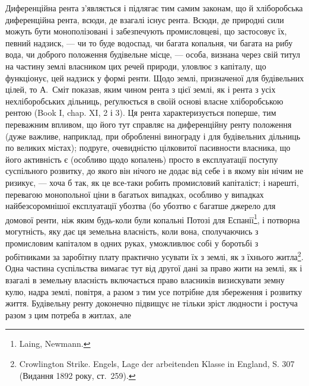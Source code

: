 Диференційна рента з’являється і підлягає тим самим законам, що й хліборобська
диференційна рента, всюди, де взагалі існує рента. Всюди, де природні
сили можуть бути монополізовані і забезпечують промисловцеві, що застосовує
їх, певний надзиск, — чи то буде водоспад, чи багата копальня, чи багата на
рибу вода, чи доброго положення будівельне місце, — особа, визнана через
свій титул на частину землі власником цих речей природи, уловлює з капіталу,
що функціонує, цей надзиск у формі ренти. Щодо землі, призначеної для будівельних
цілей, то А.~Сміт показав, яким чином рента з цієї землі, як і рента
з усіх нехліборобських дільниць, реґулюється в своїй основі власне хліборобською
рентою (Book I, chap. XI, 2 і 3). Ця рента характеризується поперше, тим
переважним впливом, що його тут справляє на диференційну ренту положення
(дуже важливе, наприклад, при обробленні винограду і для будівельних дільниць
по великих містах); подруге, очевидністю цілковитої пасивности власника, що його
активність є (особливо щодо копалень) просто в експлуатації поступу суспільного
розвитку, до якого він нічого не додає від себе і в якому він нічим не
ризикує, — хоча б так, як це все-таки робить промисловий капіталіст; і нарешті,
перевагою монопольної ціни в багатьох випадках, особливо у випадках
найбезсоромнішої експлуатації убозтва (бо убозтво є багатше джерело для
домової ренти, ніж яким будь-коли були копальні Потозі для Еспанії\footnote{
Laing, Newmann.
},
і потворна могутність, яку дає ця земельна власність, коли вона, сполучаючись
з промисловим капіталом в одних руках, уможливлює собі у боротьбі з робітниками
за заробітну плату практично усувати їх з землі, як з їхнього
житла\footnote{
Crowlington Strike. Engels, Lage der arbeitenden Klasse in England, S. 307 (Видання
1892 року, ст.~259).
}. Одна частина суспільства вимагає тут від другої дані за право
жити на землі, як і взагалі в земельну власність включається право власників
визискувати земну кулю, надра землі, повітря, а разом з тим усе
потрібне для збереження і розвитку життя. Будівельну ренту доконечно підвищує
не тільки зріст людности і ростуча разом з цим потреба в житлах, але
\parbreak{}  %

